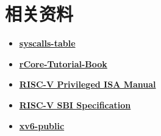 \chapter{相关资料}

\begin{itemize}
    \item \textbf{\href{https://gpages.juszkiewicz.com.pl/syscalls-table/syscalls.html}{syscalls-table}}
    \item \textbf{\href{https://rcore-os.github.io/rCore-Tutorial-Book-v3/index.html}{rCore-Tutorial-Book}}
    \item \textbf{\href{https://five-embeddev.com/riscv-priv-isa-manual/Priv-v1.12/supervisor.html#supervisor}{RISC-V Privileged ISA Manual}}
    \item \textbf{\href{https://github.com/riscv-non-isa/riscv-sbi-doc}{RISC-V SBI Specification}}
    \item \textbf{\href{https://github.com/mit-pdos/xv6-public}{xv6-public}}
\end{itemize}